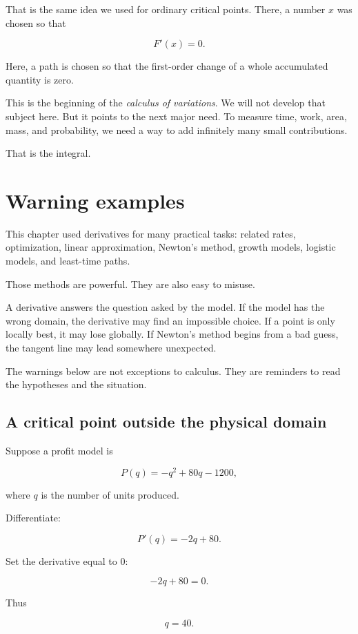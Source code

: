 That is the same idea we used for ordinary critical points.  There, a number \(x\) was
chosen so that

\[
F'(x)=0.
\]

Here, a path is chosen so that the first-order change of a whole accumulated quantity is
zero.

This is the beginning of the \emph{calculus of variations}.  We will not develop that
subject here.  But it points to the next major need.  To measure time, work, area,
mass, and probability, we need a way to add infinitely many small contributions.

That is the integral.

\section{Warning examples}
\label{sec:chapter7-warning-examples}

This chapter used derivatives for many practical tasks: related rates, optimization,
linear approximation, Newton's method, growth models, logistic models, and least-time
paths.

Those methods are powerful.  They are also easy to misuse.

A derivative answers the question asked by the model.  If the model has the wrong
domain, the derivative may find an impossible choice.  If a point is only locally best,
it may lose globally.  If Newton's method begins from a bad guess, the tangent line may
lead somewhere unexpected.

The warnings below are not exceptions to calculus.  They are reminders to read the
hypotheses and the situation.

\subsection{A critical point outside the physical domain}
\label{subsec:critical-point-outside-domain}

Suppose a profit model is

\[
P(q)=-q^2+80q-1200,
\]

where \(q\) is the number of units produced.

Differentiate:

\[
P'(q)=-2q+80.
\]

Set the derivative equal to \(0\):

\[
-2q+80=0.
\]

Thus

\[
q=40.
\]

